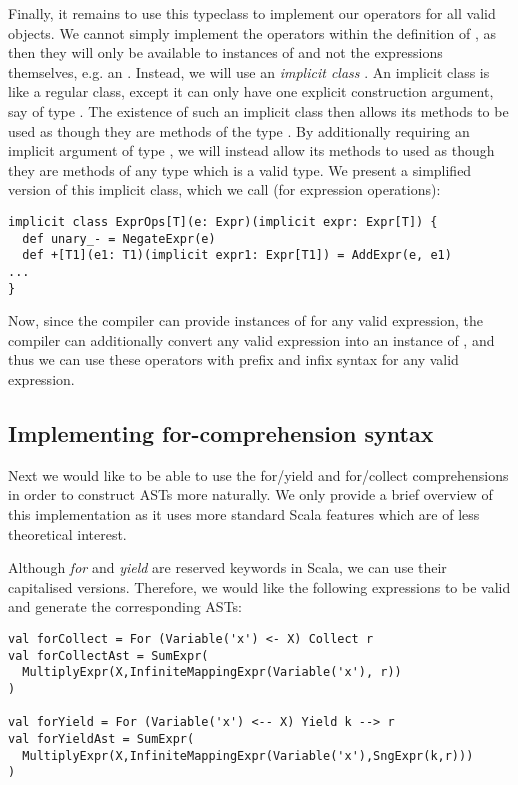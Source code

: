 Finally, it remains to use this typeclass to implement our operators for all valid objects. We cannot simply implement the operators within the definition of , as then they will only be available to instances of  and not the expressions themselves, e.g. an .
Instead, we will use an \textit{implicit class} \cite{implicitclass}. An implicit class is like a regular class, except it can only have one explicit construction argument, say of type . The existence of such an implicit class then allows its methods to be used as though they are methods of the type . By additionally requiring an implicit argument of type , we will instead allow its methods to used as though they are methods of any type  which is a valid  type.
We present a simplified version of this implicit class, which we call  (for expression operations):
\vs \begin{lstlisting}
implicit class ExprOps[T](e: Expr)(implicit expr: Expr[T]) {
  def unary_- = NegateExpr(e)
  def +[T1](e1: T1)(implicit expr1: Expr[T1]) = AddExpr(e, e1)
...
}
\end{lstlisting} \vs
Now, since the compiler can provide instances of  for any valid expression, the compiler can additionally convert any valid expression into an instance of , and thus we can use these operators with prefix and infix syntax for any valid expression.

\subsection{Implementing for-comprehension syntax}

Next we would like to be able to use the for/yield and for/collect comprehensions in order to construct ASTs more naturally. We only provide a brief overview of this implementation as it uses more standard Scala features which are of less theoretical interest.

Although \textit{for} and \textit{yield} are reserved keywords in Scala, we can use their capitalised versions. Therefore, we would like the following expressions to be valid and generate the corresponding ASTs:

\vs \begin{lstlisting}
val forCollect = For (Variable('x') <- X) Collect r
val forCollectAst = SumExpr(
  MultiplyExpr(X,InfiniteMappingExpr(Variable('x'), r))
)

val forYield = For (Variable('x') <-- X) Yield k --> r 
val forYieldAst = SumExpr(
  MultiplyExpr(X,InfiniteMappingExpr(Variable('x'),SngExpr(k,r)))
)
\end{lstlisting} \vs


